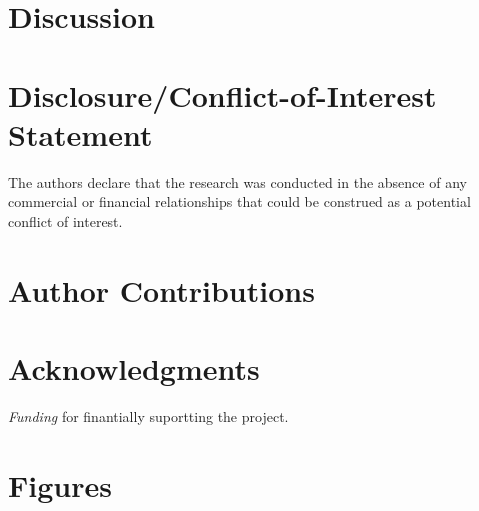 \documentclass{frontiersSCNS} %
\begin{document}
\section{Discussion}


\section*{Disclosure/Conflict-of-Interest Statement}


The authors declare that the research was conducted in the absence of any commercial or financial relationships that could be construed as a potential conflict of interest.

\section*{Author Contributions}



\section*{Acknowledgments}

\textit{Funding\textcolon} for finantially suportting the project.






\section*{Figures}

\end{document}
